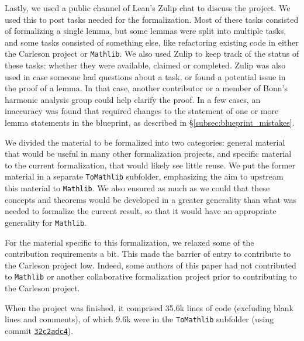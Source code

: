 \documentclass[12pt]{amsart}
\newcommand{\mathlib}{\texttt{Mathlib}\xspace}
\theoremstyle{definition}
\theoremstyle{plain}
\begin{document}
Lastly, we used a public channel of Lean's Zulip chat to discuss the project.
We used this to post tasks needed for the formalization.
Most of these tasks consisted of formalizing a single lemma,
but some lemmas were split into multiple tasks, and some tasks consisted of something else,
like refactoring existing code in either the Carleson project or \mathlib.
We also used Zulip to keep track of the status of these tasks:
whether they were available, claimed or completed.
Zulip was also used in case someone had questions about a task,
or found a potential issue in the proof of a lemma.
In that case, another contributor or a member of Bonn's harmonic analysis group could help clarify the proof.
In a few cases, an inaccuracy was found that required changes to the statement of one or more lemma statements in the blueprint,
as described in \S\ref{subsec:blueprint_mistakes}.

We divided the material to be formalized into two categories:
general material that would be useful in many other formalization projects,
and specific material to the current formalization, that would likely see little reuse.
We put the former material in a separate \texttt{ToMathlib} subfolder,
emphasizing the aim to upstream this material to \mathlib.
We also ensured as much as we could that these concepts and theorems would be developed in a greater generality than what was needed to formalize the current result,
so that it would have an appropriate generality for \mathlib.

For the material specific to this formalization, we relaxed some of the contribution requirements a bit.
This made the barrier of entry to contribute to the Carleson project low.
Indeed, some authors of this paper had not contributed to \mathlib or another collaborative formalization project
prior to contributing to the Carleson project.

When the project was finished, it comprised 35.6k lines of code (excluding blank lines and comments), of which 9.6k were in the \texttt{ToMathlib} subfolder (using commit \texttt{\href{https://github.com/fpvandoorn/carleson/tree/32c2adc411c5c274ed8f19aa8041157e394fa38a}{32c2adc4}}).

\end{document}
